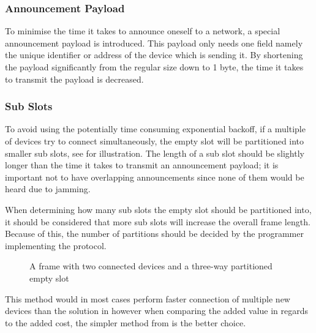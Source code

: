 \subsubsection*{Announcement Payload}\label{apay} %
\label{ssub:announcements}
To minimise the time it takes to announce oneself to a network, a special announcement payload is introduced.
This payload only needs one field namely the unique identifier or address of the device which is sending it.
By shortening the payload significantly from the regular size down to 1 byte, the time it takes to transmit the payload is decreased.

\subsubsection{Sub Slots} %
\label{ssub:sub_slots}
To avoid using the potentially time consuming exponential backoff, if a multiple of devices try to connect simultaneously, the empty slot will be partitioned into smaller sub slots, see  for illustration. 
The length of a sub slot should be slightly longer than the time it takes to transmit an announcement payload; it is important not to have overlapping announcements since none of them would be heard due to jamming.

When determining how many sub slots the empty slot should be partitioned into, it should be considered that more sub slots will increase the overall frame length.
Because of this, the number of partitions should be decided by the programmer implementing the protocol.

\begin{figure}[h]
    \centering \footnotesize
    
    \caption{A frame with two connected devices and a three-way partitioned empty slot}
    \label{fig:frame_wsubslots}
\end{figure}

\noindent
This method would in most cases perform faster connection of multiple new devices than the solution in  however when comparing the added value in regards to the added cost, the simpler method from  is the better choice.